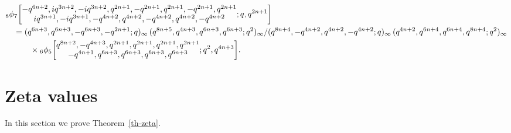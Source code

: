 \documentclass[12pt,reqno]{amsart}
\begin{document}
\begin{align*} %
&
{} _{8} \phi _{7} \biggl[ \begin{matrix} 
\def\frac#1#2{#1 / #2}  
 -q^{6 n+2}, i q^{3 n+2}, -i q^{3 n+2}, q^{2
   n+1},
                     -q^{2 n+1}, q^{2 n+1}, -q^{2
                       n+1}, q^{2 n+1} \\
\def\frac#1#2{#1 / #2}  
i q^{3 n+1}, -i q^{3 n+1}, -q^{4 n+2}, q^{4
  n+2},
                     -q^{4 n+2}, q^{4 n+2}, -q^{4 n+2} 
\end{matrix} ; q,
   q^{2n+1}\biggr]
\\ &\quad
=
\frac {(q^{6 n+3}, q^{6 n+3}, -q^{6 n+3}, -q^{2
    n+1};
                     q)_\infty\,
   (q^{8 n+5}, q^{4
                     n+3}, q^{6 n+3}, q^{6 n+3};
                     q^2)_\infty }
    {(q^{8 n+4}, -q^{4 n+2}, q^{4 n+2},
                     -q^{4 n+2}; q)_\infty\,
   (q^{4 n+2}, q^{6 n+4}, q^{6
                     n+4}, q^{8 n+4}; q^2)_\infty}
\\ &\quad\qquad
\times
{} _{6} \phi _{5} \biggl [ \begin{matrix} 
\def\frac#1#2{#1 / #2}  
q^{8 n+2}, -q^{4 n+3}, q^{2 n+1}, q^{2
  n+1}, q^{2
                     n+1}, q^{2 n+1} \\
 -q^{4 n+1}, q^{6 n+3}, q^{6 n+3}, q^{6
   n+3}, q^{6
                     n+3} 
\end{matrix} ; q^2,
   q^{4n+3}\biggr]  .
\end{align*}

\section{Zeta values}
\label{s5}

In this section we prove Theorem~\ref{th-zeta}.
\end{document}
